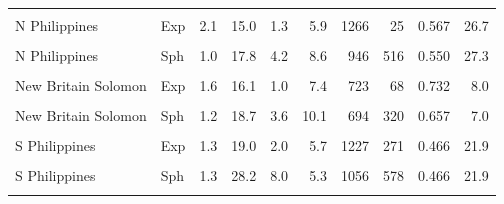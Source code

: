 \begin{ThreePartTable}
\begin{longtable}[t]{llrrrrrrrr}
\cellcolor{gray!6}{N Philippines} & \cellcolor{gray!6}{Bes} & \cellcolor{gray!6}{1.4} & \cellcolor{gray!6}{18.3} & \cellcolor{gray!6}{1.0} & \cellcolor{gray!6}{7.9} & \cellcolor{gray!6}{1258} & \cellcolor{gray!6}{19} & \cellcolor{gray!6}{0.548} & \cellcolor{gray!6}{32.0}\\
N Philippines & Exp & 2.1 & 15.0 & 1.3 & 5.9 & 1266 & 25 & 0.567 & 26.7\\
\cellcolor{gray!6}{N Philippines} & \cellcolor{gray!6}{Lin} & \cellcolor{gray!6}{3.0} & \cellcolor{gray!6}{20.0} & \cellcolor{gray!6}{1.0} & \cellcolor{gray!6}{8.6} & \cellcolor{gray!6}{1310} & \cellcolor{gray!6}{40} & \cellcolor{gray!6}{0.552} & \cellcolor{gray!6}{27.3}\\
N Philippines & Sph & 1.0 & 17.8 & 4.2 & 8.6 & 946 & 516 & 0.550 & 27.3\\
\cellcolor{gray!6}{New Britain Solomon} & \cellcolor{gray!6}{Bes} & \cellcolor{gray!6}{3.9} & \cellcolor{gray!6}{20.6} & \cellcolor{gray!6}{3.5} & \cellcolor{gray!6}{10.2} & \cellcolor{gray!6}{744} & \cellcolor{gray!6}{61} & \cellcolor{gray!6}{0.694} & \cellcolor{gray!6}{6.8}\\
New Britain Solomon & Exp & 1.6 & 16.1 & 1.0 & 7.4 & 723 & 68 & 0.732 & 8.0\\
\cellcolor{gray!6}{New Britain Solomon} & \cellcolor{gray!6}{Lin} & \cellcolor{gray!6}{2.0} & \cellcolor{gray!6}{20.2} & \cellcolor{gray!6}{5.1} & \cellcolor{gray!6}{10.2} & \cellcolor{gray!6}{693} & \cellcolor{gray!6}{228} & \cellcolor{gray!6}{0.609} & \cellcolor{gray!6}{28.2}\\
New Britain Solomon & Sph & 1.2 & 18.7 & 3.6 & 10.1 & 694 & 320 & 0.657 & 7.0\\
\cellcolor{gray!6}{S Philippines} & \cellcolor{gray!6}{Bes} & \cellcolor{gray!6}{4.1} & \cellcolor{gray!6}{16.5} & \cellcolor{gray!6}{1.1} & \cellcolor{gray!6}{5.3} & \cellcolor{gray!6}{1086} & \cellcolor{gray!6}{20} & \cellcolor{gray!6}{0.465} & \cellcolor{gray!6}{33.9}\\
S Philippines & Exp & 1.3 & 19.0 & 2.0 & 5.7 & 1227 & 271 & 0.466 & 21.9\\
\cellcolor{gray!6}{S Philippines} & \cellcolor{gray!6}{Lin} & \cellcolor{gray!6}{3.2} & \cellcolor{gray!6}{29.0} & \cellcolor{gray!6}{1.0} & \cellcolor{gray!6}{5.0} & \cellcolor{gray!6}{1014} & \cellcolor{gray!6}{40} & \cellcolor{gray!6}{0.464} & \cellcolor{gray!6}{22.9}\\
S Philippines & Sph & 1.3 & 28.2 & 8.0 & 5.3 & 1056 & 578 & 0.466 & 21.9\\
\cellcolor{gray!6}{Scotia} & \cellcolor{gray!6}{Bes} & \cellcolor{gray!6}{3.1} & \cellcolor{gray!6}{20.7} & \cellcolor{gray!6}{3.2} & \cellcolor{gray!6}{10.0} & \cellcolor{gray!6}{2120} & \cellcolor{gray!6}{195} & \cellcolor{gray!6}{0.247} & \cellcolor{gray!6}{}\\

\end{longtable}
\end{ThreePartTable}
